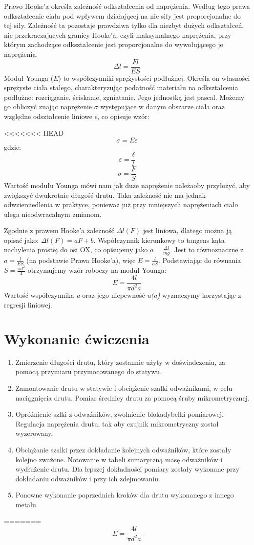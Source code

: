 \documentclass[a4paper,10pt,twoside]{article}
\begin{document}
Prawo Hooke'a określa zależność odkształcenia od naprężenia. Według tego prawa odkształcenie ciała pod wpływem działającej na nie siły jest proporcjonalne do tej siły. Zależność ta pozostaje prawdziwa tylko dla niezbyt dużych odkształceń, nie przekraczających granicy Hooke'a, czyli maksymalnego naprężenia, przy którym zachodzące odkształcenie jest proporcjonalne do wywołującego je naprężenia.
$$ \Delta l = \frac{Fl}{ES} $$
Moduł Younga ($E$) to współczynniki sprężystości podłużnej. Określa on własności sprężyste ciała stałego, charakteryzując podatność materiału na odkształcenia podłużne: rozciąganie, ściskanie, zgniatanie. Jego jednostką jest pascal. Możemy go obliczyć znając naprężenie $\sigma$ występujące w danym obszarze ciała oraz względne odształcenie liniowe $\epsilon$, co opisuje wzór:


<<<<<<< HEAD
$$ \sigma = E \varepsilon $$
gdzie:
$$ \varepsilon = \frac{\delta}{l}$$
$$\sigma = \frac{F}{S}$$
Wartość modułu Younga mówi nam jak duże naprężenie należaoby przyłożyć, aby zwiększyć dwukrotnie długość drutu. Taka zależność nie ma jednak odwzierciedlenia w praktyce, ponieważ już przy mniejszych naprężeniach ciało ulega nieodwracalnym zmianom.

Zgodnie z prawem Hooke'a zależność $\Delta l(F)$ jest liniowa, dlatego można ją opisać jako: $\Delta l(F)=aF+b$. Współczynnik kierunkowy to tangens kąta nachylenia prostej do osi OX, co opisujemy jako $a=\frac{\Delta l}{mg}$. Jest to równoznaczne z $a=\frac{l}{ES}$ (na podstawie Prawa Hooke'a), więc
$E=\frac{l}{aS}$. Podstawiając do równania $S=\frac{\pi d^2}{4}$ otrzymujemy wzór roboczy na moduł Younga:
$$E = \frac{4l}{\pi d^2 a}$$
Wartość współczynnika \textit{a} oraz jego niepewność \textit{u(a)} wyznaczymy korzystając z regresji liniowej.
\section{Wykonanie ćwiczenia}
\begin{enumerate}
	\item Zmierzenie długości drutu, który zostannie użyty w doświadczeniu, za pomocą przymiaru przymocowanego do statywu.
	\item Zamontowanie drutu w statywie i obciążenie szalki odważnikami, w celu naciągnięcia drutu. Pomiar średnicy drutu za pomocą śruby mikrometrycznej.
	\item Opróżnienie szlki z odważników, zwolnienie blokadybelki pomiarowej. Regulacja naprężenia drutu, tak aby czujnik mikrometryczny został wyzerowany.
	\item Obciążanie szalki przez dokładanie kolejnych odważników, które zostały kolejno zważone. Notowanie w tabeli sumaryczną masę odważników i wydłużenie drutu. Dla lepszej dokładności pomiary zostały wykonane przy dokładaniu odważników i przy ich zdejmowaniu.
	\item Ponowne wykonanie poprzednich kroków dla drutu wykonanego z innego metalu.
\end{enumerate}
=======
$$ E = \frac{4l}{\pi d^2 a} $$
\end{document}
